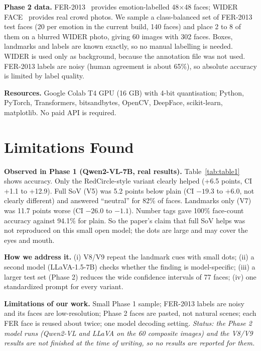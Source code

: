 \documentclass[lettersize,journal]{IEEEtran}
\begin{document}
\textbf{Phase 2 data.} FER-2013~\cite{goodfellow2013fer} provides emotion-labelled 48$\times$48 faces; WIDER FACE~\cite{yang2016wider} provides real crowd photos. We sample a class-balanced set of FER-2013 test faces (20 per emotion in the current build, 140 faces) and place 2 to 8 of them on a blurred WIDER photo, giving 60 images with 302 faces. Boxes, landmarks and labels are known exactly, so no manual labelling is needed. WIDER is used only as background, because the annotation file was not used. FER-2013 labels are noisy (human agreement is about 65\%), so absolute accuracy is limited by label quality.

\textbf{Resources.} Google Colab T4 GPU (16 GB) with 4-bit quantisation; Python, PyTorch, Transformers, bitsandbytes, OpenCV, DeepFace, scikit-learn, matplotlib. No paid API is required.

\section{Limitations Found}
\label{sec:lim}
\textbf{Observed in Phase 1 (Qwen2-VL-7B, real results).} Table~\ref{tab:table1} shows accuracy. Only the RedCircle-style variant clearly helped (+6.5 points, CI +1.1 to +12.9). Full SoV (V5) was 5.2 points below plain (CI $-19.3$ to $+6.0$, not clearly different) and answered ``neutral'' for 82\% of faces. Landmarks only (V7) was 11.7 points worse (CI $-26.0$ to $-1.1$). Number tags gave 100\% face-count accuracy against 94.1\% for plain. So the paper's claim that full SoV helps was not reproduced on this small open model; the dots are large and may cover the eyes and mouth.

\textbf{How we address it.} (i) V8/V9 repeat the landmark cues with small dots; (ii) a second model (LLaVA-1.5-7B) checks whether the finding is model-specific; (iii) a larger test set (Phase 2) reduces the wide confidence intervals of 77 faces; (iv) one standardized prompt for every variant.

\textbf{Limitations of our work.} Small Phase 1 sample; FER-2013 labels are noisy and its faces are low-resolution; Phase 2 faces are pasted, not natural scenes; each FER face is reused about twice; one model decoding setting. \emph{Status: the Phase 2 model runs (Qwen2-VL and LLaVA on the 60 composite images) and the V8/V9 results are not finished at the time of writing, so no results are reported for them.}
\end{document}
